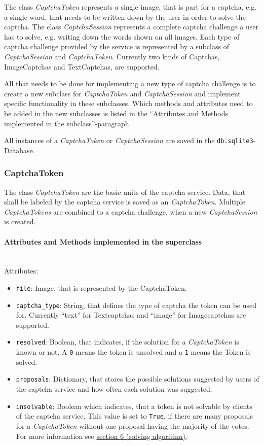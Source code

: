 The class \emph{CaptchaToken} represents a single image, that is part for a captcha, e.g. a single word, that needs to be written down by the user in order to solve the captcha. The class \emph{CaptchaSession} represents a complete captcha challenge a user has to solve, e.g. writing down the words shown on all images. Each type of captcha challenge provided by the service is represented by a subclass of \emph{CaptchaSession} and \emph{CaptchaToken}. Currently two kinds of Captchas, ImageCaptchas and TextCaptchas, are supported. 


All that needs to be done for implementing a new type of captcha challenge is to create a new subclass for \emph{CaptchaToken} and \emph{CaptchaSession} and implement specific functionality in these subclasses. Which methods and attributes need to be added in the new subclasses is listed in the ``Attributes and Methods implemented in the subclass''-paragraph.

All instances of a \emph{CaptchaToken} or \emph{CaptchaSession} are saved in the \verb|db.sqlite3|-Database. 

\subsubsection{CaptchaToken}

The class \emph{CaptchaToken} are the basic units of the captcha service. Data, that shall be labeled by the captcha service is saved as an \emph{CaptchaToken}. Multiple \emph{CaptchaTokens} are combined to a captcha challenge, when a new \emph{CaptchaSession} is created.

\paragraph{Attributes and Methods implemented in the superclass} \mbox{} \\

Attributes:

\begin{itemize}
\item \verb|file|: Image, that is represented by the CaptchaToken.
\item \verb|captcha_type|: String, that defines the type of captcha the token can be used for. Currently ``text'' for Textcaptchas and ``image'' for Imagecaptchas are supported.
\item \verb|resolved|: Boolean, that indicates, if the solution for a \emph{CaptchaToken} is known or not. A \verb|0| means the token is unsolved and a \verb|1| means the Token is solved.
\item \verb|proposals|: Dictionary, that stores the possible solutions suggested by users of the captcha service and how often each solution was suggested.
\item \verb|insolvable|: Boolean which indicates, that a token is not solvable by clients of the captcha service. This value is set to \verb|True|, if there are many proposals for a \emph{CaptchaToken} without one proposal having the majority of the votes. For more information see \hyperref[sec:solving_algorithm]{section 6 (solving algorithm)}.
\end{itemize}

